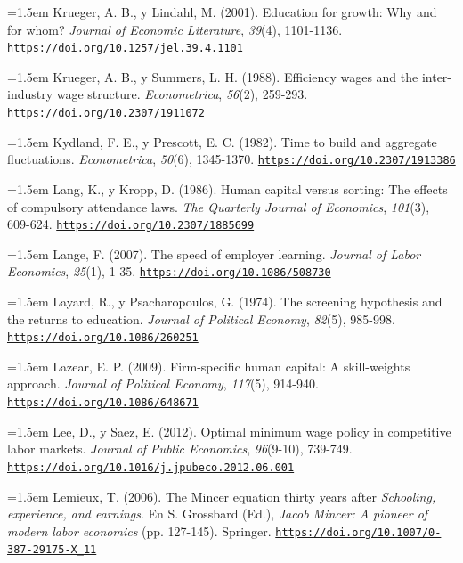 \documentclass[10pt,a4paper]{article}
\begin{document}
\noindent\hangindent=1.5em Krueger, A. B., y Lindahl, M. (2001). Education for growth: Why and for whom? \textit{Journal of Economic Literature}, \textit{39}(4), 1101-1136. \href{https://doi.org/10.1257/jel.39.4.1101}{\nolinkurl{https://doi.org/10.1257/jel.39.4.1101}}

\noindent\hangindent=1.5em Krueger, A. B., y Summers, L. H. (1988). Efficiency wages and the inter-industry wage structure. \textit{Econometrica}, \textit{56}(2), 259-293. \href{https://doi.org/10.2307/1911072}{\nolinkurl{https://doi.org/10.2307/1911072}}

\noindent\hangindent=1.5em Kydland, F. E., y Prescott, E. C. (1982). Time to build and aggregate fluctuations. \textit{Econometrica}, \textit{50}(6), 1345-1370. \href{https://doi.org/10.2307/1913386}{\nolinkurl{https://doi.org/10.2307/1913386}}

\noindent\hangindent=1.5em Lang, K., y Kropp, D. (1986). Human capital versus sorting: The effects of compulsory attendance laws. \textit{The Quarterly Journal of Economics}, \textit{101}(3), 609-624. \href{https://doi.org/10.2307/1885699}{\nolinkurl{https://doi.org/10.2307/1885699}}

\noindent\hangindent=1.5em Lange, F. (2007). The speed of employer learning. \textit{Journal of Labor Economics}, \textit{25}(1), 1-35. \href{https://doi.org/10.1086/508730}{\nolinkurl{https://doi.org/10.1086/508730}}

\noindent\hangindent=1.5em Layard, R., y Psacharopoulos, G. (1974). The screening hypothesis and the returns to education. \textit{Journal of Political Economy}, \textit{82}(5), 985-998. \href{https://doi.org/10.1086/260251}{\nolinkurl{https://doi.org/10.1086/260251}}

\noindent\hangindent=1.5em Lazear, E. P. (2009). Firm-specific human capital: A skill-weights approach. \textit{Journal of Political Economy}, \textit{117}(5), 914-940. \href{https://doi.org/10.1086/648671}{\nolinkurl{https://doi.org/10.1086/648671}}

\noindent\hangindent=1.5em Lee, D., y Saez, E. (2012). Optimal minimum wage policy in competitive labor markets. \textit{Journal of Public Economics}, \textit{96}(9-10), 739-749. \href{https://doi.org/10.1016/j.jpubeco.2012.06.001}{\nolinkurl{https://doi.org/10.1016/j.jpubeco.2012.06.001}}

{\sloppy\noindent\hangindent=1.5em Lemieux, T. (2006). The Mincer equation thirty years after \textit{Schooling, experience, and earnings}. En S. Grossbard (Ed.), \textit{Jacob Mincer: A pioneer of modern labor economics} (pp. 127-145). Springer. \href{https://doi.org/10.1007/0-387-29175-X_11}{\nolinkurl{https://doi.org/10.1007/0-387-29175-X_11}}\par}
\end{document}
